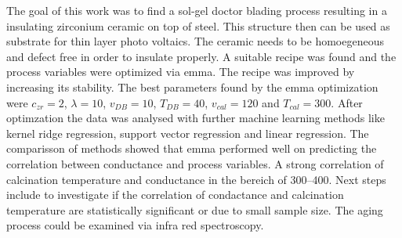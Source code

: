 The goal of this work was to find a sol-gel doctor blading process resulting in a insulating zirconium ceramic on top of steel.
This structure then can be used as substrate for thin layer photo voltaics. 
The ceramic needs to be homoegeneous and defect free in order to insulate properly.
A suitable recipe was found\cite{Hu2016} and the process variables were optimized via \gls{emma}. 
The recipe was improved by increasing its stability. 
The best parameters found by the emma optimization were 
$c_{zr}=2$, $\lambda=10$, $v_{DB}=10$, $T_{DB}=40$, $v_{cal}=120$ and $T_{cal}=300$.
After optimzation the data was analysed with further machine learning methods like kernel ridge regression, support vector regression and linear regression. 
The comparisson of methods showed that \gls{emma} performed well on predicting the correlation between conductance and process variables. 
A strong correlation of calcination temperature and conductance in the bereich of 300--400\oc{}. 
Next steps include to investigate if the correlation of condactance and calcination temperature are statistically significant or due to small sample size. 
The aging process could be examined via infra red spectroscopy. 
\iffalse
was kann noch veraendert werden? 
humidity 
solution age
vdb and tdb on g and phd 
Tcal on g and phd 

Making of the solution for the sol-gel process:
For a single concentrated solution \ml{0.05} of \gls{zrpro} are added while stirring to \ml{4.95} of \gls{buoh} and stirred for \minutes{15}. 
\ml{0.013} (or one molar equvilent of Zr) of \gls{acac} is added to the stirring solution. 
After another \minutes{15} \ml{1} of acetic acid is added and stirred for \minutes{30} to stabilize the solution up to \h{24}. 

The concentration can be increased up to 5 times being stable for a minimum of \h{4}. 
The sol-gel process produces am homogeneous transparent crystalline zirconia oxide layer. 
homogeneity can be mainly controlled via blade velocity and temperature and layers can be stacked.

It should have been also verglichen with grid search with comparable size
but most time was used to find a vernuenfig base recipe and process

It is still very human 
Der process is - as it the case with all ML and most fitting processes - is very abhaengig von hyper parameters, 
In the current work population size, number of generations, and most importantly boundaries (grenzen). 
\fi
